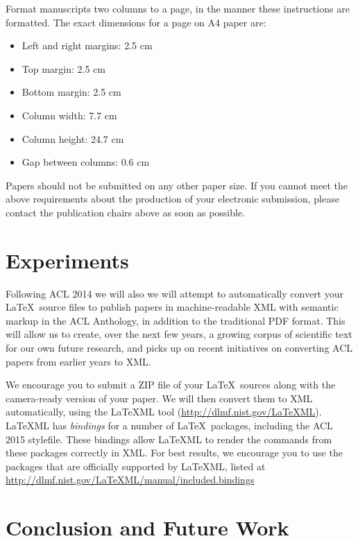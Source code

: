 \documentclass[11pt]{article}
\begin{document}
Format manuscripts two columns to a page, in the manner these
instructions are formatted. The exact dimensions for a page on A4
paper are:

\begin{itemize}
\item Left and right margins: 2.5 cm
\item Top margin: 2.5 cm
\item Bottom margin: 2.5 cm
\item Column width: 7.7 cm
\item Column height: 24.7 cm
\item Gap between columns: 0.6 cm
\end{itemize}

\noindent Papers should not be submitted on any other paper size.
 If you cannot meet the above requirements about the production of
 your electronic submission, please contact the publication chairs
 above as soon as possible.

\section{Experiments}

Following ACL 2014 we will also we will attempt to automatically convert
your \LaTeX\ source files to publish papers in machine-readable
XML with semantic markup in the ACL Anthology, in addition to the
traditional PDF format.  This will allow us to create, over the next
few years, a growing corpus of scientific text for our own future research,
and picks up on recent initiatives on converting ACL papers from earlier
years to XML.

We encourage you to submit a ZIP file of your \LaTeX\ sources along
with the camera-ready version of your paper. We will then convert them
to XML automatically, using the LaTeXML tool
(\url{http://dlmf.nist.gov/LaTeXML}). LaTeXML has \emph{bindings} for
a number of \LaTeX\ packages, including the ACL 2015 stylefile. These
bindings allow LaTeXML to render the commands from these packages
correctly in XML. For best results, we encourage you to use the
packages that are officially supported by LaTeXML, listed at
\url{http://dlmf.nist.gov/LaTeXML/manual/included.bindings}





\section{Conclusion and Future Work}
\end{document}
